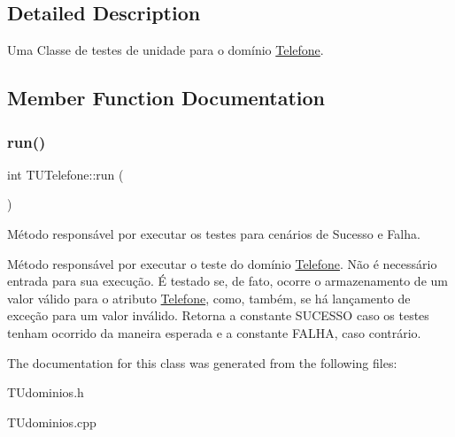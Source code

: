 \subsection{Detailed Description}
Uma Classe de testes de unidade para o domínio \hyperlink{classTelefone}{Telefone}. 

\subsection{Member Function Documentation}
\mbox{\label{classTUTelefone_abdf98e48a737ab44ad59cc63f26d6788}} 
\subsubsection{\texorpdfstring{run()}{run()}}
{\footnotesize\ttfamily int T\+U\+Telefone\+::run (\begin{DoxyParamCaption}{ }\end{DoxyParamCaption})}



Método responsável por executar os testes para cenários de Sucesso e Falha. 

Método responsável por executar o teste do domínio \hyperlink{classTelefone}{Telefone}. Não é necessário entrada para sua execução. É testado se, de fato, ocorre o armazenamento de um valor válido para o atributo \hyperlink{classTelefone}{Telefone}, como, também, se há lançamento de exceção para um valor inválido. Retorna a constante S\+U\+C\+E\+S\+SO caso os testes tenham ocorrido da maneira esperada e a constante F\+A\+L\+HA, caso contrário. 

The documentation for this class was generated from the following files\+:\begin{DoxyCompactItemize}
\item 
T\+Udominios.\+h\item 
T\+Udominios.\+cpp\end{DoxyCompactItemize}
